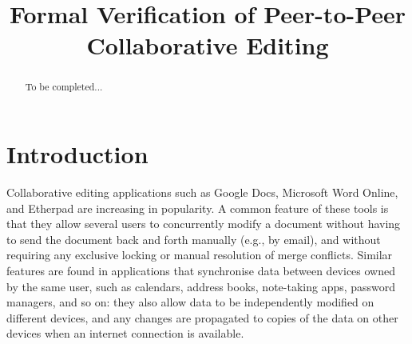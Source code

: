\documentclass[acmlarge,review,anonymous]{acmart}\settopmatter{printfolios=true}
\begin{document}
\title{Formal Verification of Peer-to-Peer Collaborative Editing}

\maketitle

\begin{abstract}
To be completed...
\end{abstract}


\section{Introduction}
\label{sect.introduction}

Collaborative editing applications such as Google Docs, Microsoft Word Online, and Etherpad are
increasing in popularity. A common feature of these tools is that they allow several users to
concurrently modify a document without having to send the document back and forth manually (e.g., by
email), and without requiring any exclusive locking or manual resolution of merge conflicts. Similar
features are found in applications that synchronise data between devices owned by the same user,
such as calendars, address books, note-taking apps, password managers, and so on: they also allow
data to be independently modified on different devices, and any changes are propagated to copies of
the data on other devices when an internet connection is available.
\end{document}
